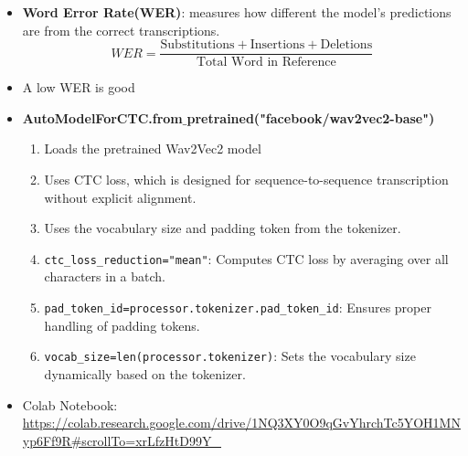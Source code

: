 \documentclass[a4paper]{article}
\begin{document}
\begin{itemize}
    \item \textbf{Word Error Rate(WER)}: measures how different the model’s predictions are from the correct transcriptions.
    \begin{equation*}
        WER=\frac{\text{Substitutions}+\text{Insertions}+\text{Deletions}}{\text{Total Word in Reference}}
    \end{equation*}
    \item A low WER is good
    \item \textbf{AutoModelForCTC.from$\_$pretrained("facebook/wav2vec2-base")}
    \begin{enumerate}
        \item Loads the pretrained Wav2Vec2 model 
        \item Uses CTC loss, which is designed for sequence-to-sequence transcription without explicit alignment.
        \item Uses the vocabulary size and padding token from the tokenizer.
        \item \verb|ctc_loss_reduction="mean"|: Computes CTC loss by averaging over all characters in a batch.
        \item \verb|pad_token_id=processor.tokenizer.pad_token_id|: Ensures proper handling of padding tokens.
        \item \verb|vocab_size=len(processor.tokenizer)|: Sets the vocabulary size dynamically based on the tokenizer.
    \end{enumerate}
    \item Colab Notebook: \url{https://colab.research.google.com/drive/1NQ3XY0O9qGvYhrchTc5YOH1MNyp6Ff9R#scrollTo=xrLfzHtD99Y_}
\end{itemize}
\end{document}
